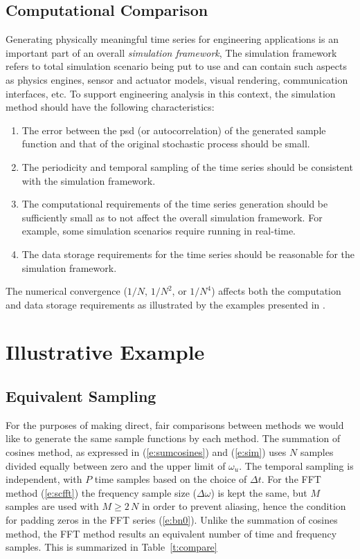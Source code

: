 \documentclass[techreport, article]{npsreport2018}
\begin{document}
\subsection{Computational Comparison}

Generating physically meaningful time series for engineering applications is an important part of an overall \emph{simulation framework},  The simulation framework refers to total simulation scenario being put to use and can contain such aspects as physics engines, sensor and actuator models, visual rendering, communication interfaces, etc.  To support engineering analysis in this context, the simulation method should have the following characteristics:
\begin{enumerate}
\item The error between the \ac{psd} (or autocorrelation) of the generated sample function and that of the original stochastic process should be small.
\item The periodicity and temporal sampling of the time series should be consistent with the simulation framework.
\item The computational requirements of the time series generation should be sufficiently small as to not affect the overall simulation framework.  For example, some simulation scenarios require running in real-time.
\item The data storage requirements for the time series should be reasonable for the simulation framework.
\end{enumerate}

The numerical convergence ($1/N$, $1/N^2$, or $1/N^4$) affects both the computation and data storage requirements as illustrated by the examples presented in \cite{hu97simulation}.

\section{Illustrative Example}

\subsection{Equivalent Sampling}

For the purposes of making direct, fair comparisons between methods we would like to generate the same sample functions by each method.  The summation of cosines method, as expressed in (\ref{e:sumcosines}) and (\ref{e:sim}) uses $N$ samples divided equally between zero and the upper limit of $\omega_u$.  The temporal sampling is independent, with $P$ time samples based on the choice of $\Delta t$.  For the FFT method (\ref{e:scfft}) the frequency sample size ($\Delta \omega$) is kept the same, but $M$ samples are used with $M\geq 2 \, N$ in order to prevent aliasing, hence the condition for padding zeros in the FFT series (\ref{e:bn0}).  Unlike the summation of cosines method, the FFT method results an equivalent number of time and frequency samples.  This is summarized in Table~\ref{t:compare}
\end{document}
